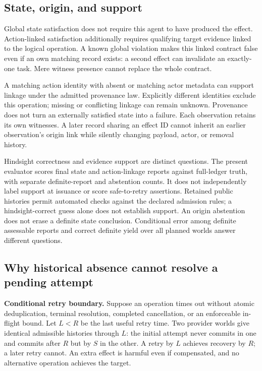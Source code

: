 \documentclass[conference]{IEEEtran}
\begin{document}
\subsection{State, origin, and support}

Global state satisfaction does not require this agent to have produced the effect. Action-linked satisfaction additionally requires qualifying target evidence linked to the logical operation. A known global violation makes this linked contract false even if an own matching record exists: a second effect can invalidate an exactly-one task. Mere witness presence cannot replace the whole contract.

A matching action identity with absent or matching actor metadata can support linkage under the admitted provenance law. Explicitly different identities exclude this operation; missing or conflicting linkage can remain unknown. Provenance does not turn an externally satisfied state into a failure. Each observation retains its own witnesses. A later record sharing an effect ID cannot inherit an earlier observation's origin link while silently changing payload, actor, or removal history.

Hindsight correctness and evidence support are distinct questions. The present evaluator scores final state and action-linkage reports against full-ledger truth, with separate definite-report and abstention counts. It does not independently label support at issuance or score safe-to-retry assertions. Retained public histories permit automated checks against the declared admission rules; a hindsight-correct guess alone does not establish support. An origin abstention does not erase a definite state conclusion. Conditional error among definite assessable reports and correct definite yield over all planned worlds answer different questions.

\subsection{Why historical absence cannot resolve a pending attempt}

\textbf{Conditional retry boundary.} Suppose an operation times out without atomic deduplication, terminal resolution, completed cancellation, or an enforceable in-flight bound. Let $L<R$ be the last useful retry time. Two provider worlds give identical admissible histories through $L$: the initial attempt never commits in one and commits after $R$ but by $S$ in the other. A retry by $L$ achieves recovery by $R$; a later retry cannot. An extra effect is harmful even if compensated, and no alternative operation achieves the target.
\end{document}

